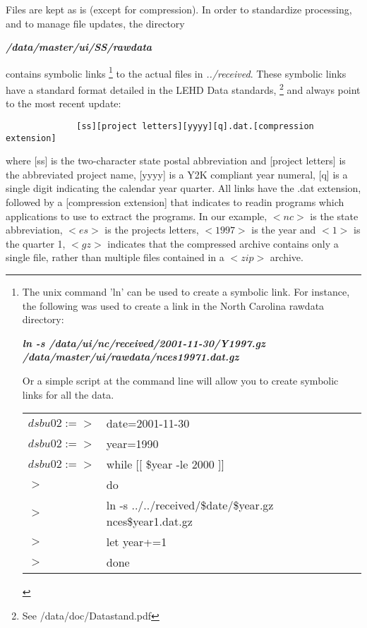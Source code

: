 Files are kept as is (except for compression). In order to standardize
processing, and to manage file updates, the  directory 
\begin{center}
  \textbf{\textit{/data/master/ui/SS/rawdata}}
\end{center}
contains symbolic links%
%
\footnote{The unix command 'ln' can be used to create a symbolic link. For instance, the following  was used to create a link in the North Carolina rawdata directory:
\begin{center}
\textbf{\textit{ln -s /data/ui/nc/received/2001-11-30/Y1997.gz /data/master/ui/rawdata/nces19971.dat.gz }}
\end{center}

Or a simple script at the command line will allow you to create symbolic links for all the data.

\begin{tabular}{ll}
$dsbu02:=>$& date=2001-11-30 \\
$dsbu02:=>$& year=1990 \\
$dsbu02:=>$& while [[ \$year -le 2000 ]]\\
$>$& do\\
$>$& ln -s ../../received/\$date/\${year}.gz nces\${year}1.dat.gz\\
$>$& let year+=1\\
$>$& done\\
\end{tabular}
}
%
to the actual files in \textit{../received}. These
symbolic links have a standard format detailed in the LEHD Data standards,%
%
\footnote{See /data/doc/Datastand.pdf }
%
and always point to the most recent update:
\begin{center}
\begin{verbatim}
              [ss][project letters][yyyy][q].dat.[compression extension]
\end{verbatim}
\end{center}
where [ss] is the two-character state postal abbreviation and [project
letters] is the abbreviated project name, [yyyy] is a Y2K compliant year
numeral, [q] is a single digit indicating the calendar year quarter. All
links have the .dat extension, followed by a [compression extension] that
indicates to readin programs which applications to use to extract the
programs. In our example, $<nc>$ is the state abbreviation, $<es>$ is the
projects letters, $<1997>$ is the year and $<1>$ is the quarter 1, $<gz>$
indicates that the compressed archive contains only a single file, rather
than multiple files contained in a $<zip>$ archive.



